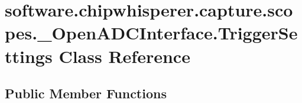 \hypertarget{classsoftware_1_1chipwhisperer_1_1capture_1_1scopes_1_1__OpenADCInterface_1_1TriggerSettings}{}\section{software.\+chipwhisperer.\+capture.\+scopes.\+\_\+\+Open\+A\+D\+C\+Interface.\+Trigger\+Settings Class Reference}
\label{classsoftware_1_1chipwhisperer_1_1capture_1_1scopes_1_1__OpenADCInterface_1_1TriggerSettings}
\subsection*{Public Member Functions}
